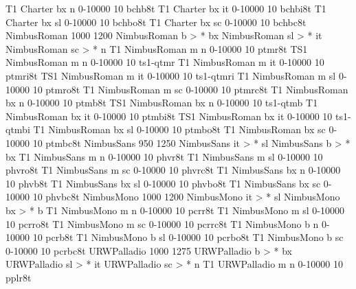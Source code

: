 \declarefont T1 Charter bx  n  0-10000   10 bchb8t
\declarefont T1 Charter bx  it 0-10000   10 bchbi8t
\declarefont T1 Charter bx  sl 0-10000   10 bchbo8t
\declarefont T1 Charter bx  sc 0-10000   10 bchbc8t
%
%
\declarefontfamily NimbusRoman 1000 1200
\fontmapseries NimbusRoman b > * bx
\fontmapshape NimbusRoman sl > * it %
\fontmapshape NimbusRoman sc > * n  %
\declarefont T1  NimbusRoman m   n  0-10000   10 ptmr8t
\declarefont TS1 NimbusRoman m   n  0-10000   10 ts1-qtmr
\declarefont T1  NimbusRoman m   it 0-10000   10 ptmri8t
\declarefont TS1 NimbusRoman m   it 0-10000   10 ts1-qtmri
\declarefont T1  NimbusRoman m   sl 0-10000   10 ptmro8t
\declarefont T1  NimbusRoman m   sc 0-10000   10 ptmrc8t
\declarefont T1  NimbusRoman bx  n  0-10000   10 ptmb8t
\declarefont TS1 NimbusRoman bx  n  0-10000   10 ts1-qtmb
\declarefont T1  NimbusRoman bx  it 0-10000   10 ptmbi8t
\declarefont TS1 NimbusRoman bx  it 0-10000   10 ts1-qtmbi
\declarefont T1  NimbusRoman bx  sl 0-10000   10 ptmbo8t
\declarefont T1  NimbusRoman bx  sc 0-10000   10 ptmbc8t
%
%
\declarefontfamily NimbusSans 950 1250
\fontmapshape NimbusSans it > * sl
\fontmapseries NimbusSans b > * bx
\declarefont T1 NimbusSans m   n  0-10000   10 phvr8t
\declarefont T1 NimbusSans m   sl 0-10000   10 phvro8t
\declarefont T1 NimbusSans m   sc 0-10000   10 phvrc8t
\declarefont T1 NimbusSans bx  n  0-10000   10 phvb8t
\declarefont T1 NimbusSans bx  sl 0-10000   10 phvbo8t
\declarefont T1 NimbusSans bx  sc 0-10000   10 phvbc8t
%
%
\declarefontfamily NimbusMono 1000 1200
\fontmapshape NimbusMono it > * sl
\fontmapseries NimbusMono bx > * b
\declarefont T1 NimbusMono m   n  0-10000   10 pcrr8t
\declarefont T1 NimbusMono m   sl 0-10000   10 pcrro8t
\declarefont T1 NimbusMono m   sc 0-10000   10 pcrrc8t
\declarefont T1 NimbusMono b   n  0-10000   10 pcrb8t
\declarefont T1 NimbusMono b   sl 0-10000   10 pcrbo8t
\declarefont T1 NimbusMono b   sc 0-10000   10 pcrbc8t
%
%
\declarefontfamily URWPalladio 1000 1275
\fontmapseries URWPalladio b > * bx
\fontmapshape URWPalladio sl > * it %
\fontmapshape URWPalladio sc > * n  %
\declarefont T1  URWPalladio m   n  0-10000   10 pplr8t

